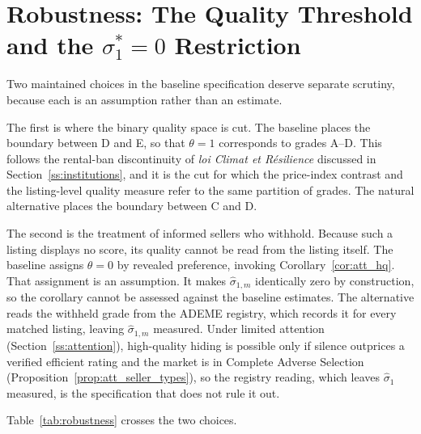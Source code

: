 
\section{Robustness: The Quality Threshold and the $\sigma_1^*=0$ Restriction}
\label{app:robustness}

Two maintained choices in the baseline specification deserve separate scrutiny, because each
is an assumption rather than an estimate.

The first is where the binary quality space is cut. The baseline places the boundary between
D and E, so that $\theta=1$ corresponds to grades A--D. This follows the rental-ban
discontinuity of \emph{loi Climat et R\'esilience} discussed in
Section~\ref{ss:institutions}, and it is the cut for which the price-index contrast and the
listing-level quality measure refer to the same partition of grades. The natural alternative
places the boundary between C and D.

The second is the treatment of informed sellers who withhold. Because such a listing displays
no score, its quality cannot be read from the listing itself. The baseline assigns
$\theta=0$ by revealed preference, invoking Corollary~\ref{cor:att_hq}. That assignment
is an assumption. It makes
$\hat\sigma_{1,m}$ identically zero by construction, so the corollary cannot be assessed
against the baseline estimates. The alternative reads the withheld grade from the ADEME
registry, which records it for every matched listing, leaving $\hat\sigma_{1,m}$ measured. Under limited attention (Section~\ref{ss:attention}), high-quality hiding is possible only if silence outprices a verified efficient rating and the market is in Complete Adverse Selection (Proposition~\ref{prop:att_seller_types}), so the registry reading, which leaves $\hat\sigma_1$ measured, is the specification that does not rule it out.

Table~\ref{tab:robustness} crosses the two choices.

